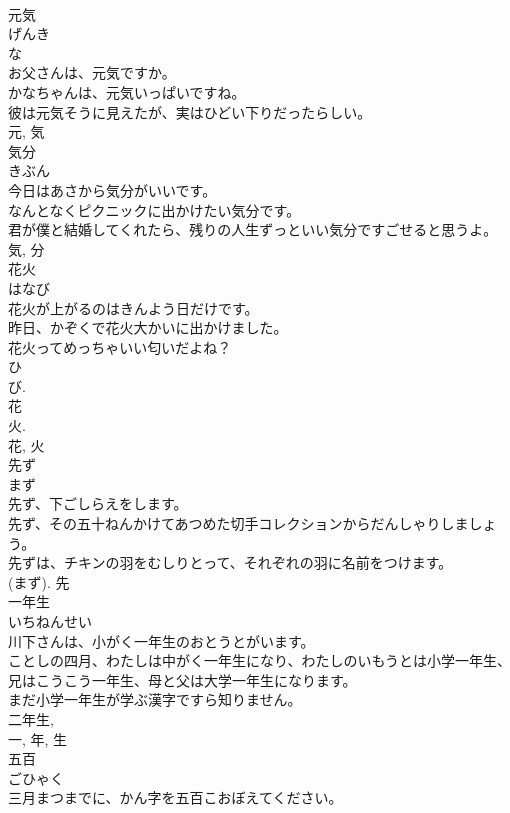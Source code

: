 \documentclass[8pt]{extreport}
\begin{document}
\begin{CJK}{UTF8}{min}
\\	元気	
\\	げんき	
\\	な 
\\	お父さんは、元気ですか。	
\\	かなちゃんは、元気いっぱいですね。	
\\	彼は元気そうに見えたが、実はひどい下りだったらしい。	
\\	元, 気	
\\	気分	
\\	きぶん	
\\	今日はあさから気分がいいです。	
\\	なんとなくピクニックに出かけたい気分です。	
\\	君が僕と結婚してくれたら、残りの人生ずっといい気分ですごせると思うよ。	
\\	気, 分	
\\	花火	
\\	はなび	
\\	花火が上がるのはきんよう日だけです。	
\\	昨日、かぞくで花火大かいに出かけました。	
\\	花火ってめっちゃいい匂いだよね？	
\\	ひ 
\\	び. 
\\	花 
\\	火. 
\\	花, 火	
\\	先ず	
\\	まず	
\\	先ず、下ごしらえをします。	
\\	先ず、その五十ねんかけてあつめた切手コレクションからだんしゃりしましょう。	
\\	先ずは、チキンの羽をむしりとって、それぞれの羽に名前をつけます。	
\\	(まず).	先	
\\	一年生	
\\	いちねんせい	
\\	川下さんは、小がく一年生のおとうとがいます。	
\\	ことしの四月、わたしは中がく一年生になり、わたしのいもうとは小学一年生、兄はこうこう一年生、母と父は大学一年生になります。	
\\	まだ小学一年生が学ぶ漢字ですら知りません。	
\\	二年生, 
\\	一, 年, 生	
\\	五百	
\\	ごひゃく	
\\	三月まつまでに、かん字を五百こおぼえてください。	

\end{CJK}
\end{document}
